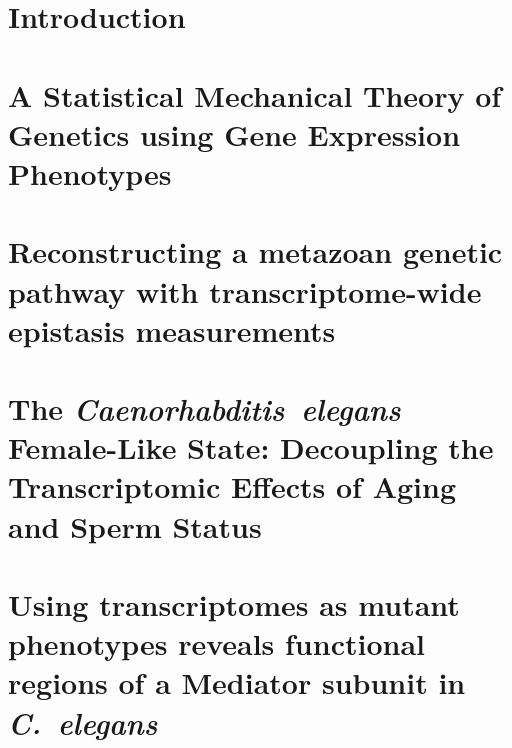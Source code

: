 \documentclass[12pt]{caltech_thesis}
\newcommand{\cel}{\emph{C.~elegans}}
\begin{document}
\chapter{Introduction}
\begin{refsection}
  
  \printbibliography[heading=subbibliography]
\end{refsection}

\chapter{A Statistical Mechanical Theory of Genetics using Gene Expression
         Phenotypes}
\begin{refsection}
  
  \printbibliography[heading=subbibliography]
\end{refsection}

\chapter{Reconstructing a metazoan genetic pathway with transcriptome-wide
         epistasis measurements}
\begin{refsection}
  
  \printbibliography[heading=subbibliography]
\end{refsection}

\chapter{The \emph{Caenorhabditis~elegans} Female-Like State: Decoupling the
         Transcriptomic Effects of Aging and Sperm Status}
\begin{refsection}
  
  \printbibliography[heading=subbibliography]
\end{refsection}

\chapter{Using transcriptomes as mutant phenotypes reveals functional regions of
         a Mediator subunit in \cel{}}
\begin{refsection}
  
  \printbibliography[heading=subbibliography]
\end{refsection}
\end{document}
